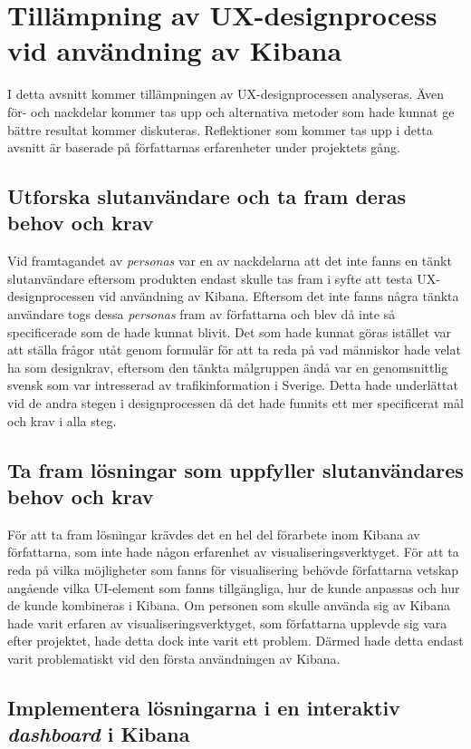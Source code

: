 \documentclass[12pt]{kththesis}
\begin{document}
\section{Tillämpning av UX-designprocess vid användning av Kibana} 
I detta avsnitt kommer tillämpningen av UX-designprocessen analyseras. Även för- och nackdelar kommer tas upp och alternativa metoder som hade kunnat ge bättre resultat kommer diskuteras.  Reflektioner som kommer tas upp i detta avsnitt är baserade på författarnas erfarenheter under projektets gång.

\subsection{Utforska slutanvändare och ta fram deras behov och krav} 
Vid framtagandet av \textit{personas} var en av nackdelarna att det inte fanns en tänkt slutanvändare eftersom produkten endast skulle tas fram i syfte att testa UX-designprocessen vid användning av Kibana. Eftersom det inte fanns några tänkta användare togs dessa \textit{personas} fram av författarna och blev då inte så specificerade som de hade kunnat blivit. Det som hade kunnat göras istället var att ställa frågor utåt genom formulär för att ta reda på vad människor hade velat ha som designkrav, eftersom den tänkta målgruppen ändå var en genomsnittlig svensk som var intresserad av trafikinformation i Sverige. Detta hade underlättat vid de andra stegen i designprocessen då det hade funnits ett mer specificerat mål och krav i alla steg.

\subsection{Ta fram lösningar som uppfyller slutanvändares behov och krav}
För att ta fram lösningar krävdes det en hel del förarbete inom Kibana av författarna, som inte hade någon erfarenhet av visualiseringsverktyget. För att ta reda på vilka möjligheter som fanns för visualisering behövde författarna vetskap angående vilka UI-element som fanns tillgängliga, hur de kunde anpassas och hur de kunde kombineras i Kibana. Om personen som skulle använda sig av Kibana hade varit erfaren av visualiseringsverktyget, som författarna upplevde sig vara efter projektet, hade detta dock inte varit ett problem. Därmed hade detta endast varit problematiskt vid den första användningen av Kibana.

\subsection{Implementera lösningarna i en interaktiv \textit{dashboard} i Kibana}
\end{document}
